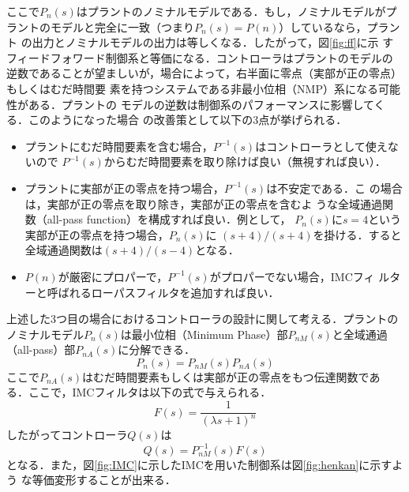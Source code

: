 \documentclass[a4paper,12pt]{jarticle}
\begin{document}
%
ここで$P_n(s)$はプラントのノミナルモデルである．もし，ノミナルモデルがプ
ラントのモデルと完全に一致（つまり$P_n(s)=P(n)$）しているなら，プラント
の出力とノミナルモデルの出力は等しくなる．したがって，図\ref{fig:ff}に示
すフィードフォワード制御系と等価になる．コントローラはプラントのモデルの
逆数であることが望ましいが，場合によって，右半面に零点（実部が正の零点）もしくはむだ時間要
素を持つシステムである非最小位相（NMP）系になる可能性がある．プラントの
モデルの逆数は制御系のパフォーマンスに影響してくる．このようになった場合
の改善策として以下の3点が挙げられる．
%
\begin{itemize}
 \item プラントにむだ時間要素を含む場合，$P^{-1}(s)$はコントローラとして使えないので
	   $P^{-1}(s)$からむだ時間要素を取り除けば良い（無視すれば良い）．
	   
 \item プラントに実部が正の零点を持つ場合，$P^{-1}(s)$は不安定である．こ
	   の場合は，実部が正の零点を取り除き，実部が正の零点を含むよ
	   うな全域通過関数（all-pass function）を構成すれば良い．例として，
	   $P_n(s)$に$s=4$という実部が正の零点を持つ場合，$P_n(s)$に
	   $(s+4)/(s+4)$を掛ける．すると全域通過関数は$(s+4)/(s-4)$となる．
	   
 \item $P(n)$が厳密にプロパーで，$P^{-1}(s)$がプロパーでない場合，IMCフィ
	   ルターと呼ばれるローパスフィルタを追加すれば良い．
\end{itemize}
%
上述した3つ目の場合におけるコントローラの設計に関して考える．プラントの
ノミナルモデル$P_n(s)$は最小位相（Minimum Phase）部$P_{nM}(s)$と全域通過
（all-pass）部$P_{nA}(s)$に分解できる．
%
\begin{equation}
 P_n(s)=P_{nM}(s)P_{nA}(s)
\end{equation}
%
ここで$P_{nA}(s)$はむだ時間要素もしくは実部が正の零点をもつ伝達関数であ
る．ここで，IMCフィルタは以下の式で与えられる．
%
\begin{equation}\label{equ:imc_f}
 F(s) = \frac{1}{(\lambda s + 1)^n}
\end{equation}
%
したがってコントローラ$Q(s)$は
%
\begin{equation}\label{equ:imc_c}
 Q(s) = P_{nM}^{-1}(s)F(s)
\end{equation}
%
となる．また，図\ref{fig:IMC}に示したIMCを用いた制御系は図\ref{fig:henkan}に示すよう
な等価変形することが出来る．
%
\end{document}
